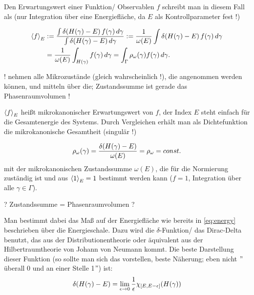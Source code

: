 \documentclass[../KlassMech_main.tex]{subfiles}
\begin{document}
Den Erwartungswert einer Funktion/ Observablen $f$ schreibt man in diesem Fall als (nur Integration über eine Energiefläche, da $E$ als Kontrollparameter fest !)

\begin{align}\label{eq:microzust}
\expval{f}_E &:= %
\frac{\int \delta\qty(H(\gamma) - E) \, f(\gamma) \, d\gamma}{\int \delta\qty(H(\gamma) - E) \, d\gamma} := \frac{1}{\omega(E)} \int \delta\qty(H(\gamma) - E) \, f(\gamma) \, d\gamma
\\
&= \frac{1}{\omega(E)} \int_{H(\gamma)} f(\gamma) \, d\gamma = \int_\Gamma \rho_\omega(\gamma) f(\gamma) \, d\gamma \notag .
\end{align}

! nehmen alle Mikrozustände (gleich wahrscheinlich !), die angenommen werden können, und mitteln über die; Zustandssumme ist gerade das Phasenraumvolumen !

$\expval{f}_E$ heißt mikrokanonischer Erwartungswert von $f$, der Index $E$ steht einfach für die Gesamtenergie des Systems. Durch Vergleichen erhält man als Dichtefunktion die mikrokanonische Gesamtheit (singulär !)

\begin{equation}\label{eq:dichtef}
\rho_\omega(\gamma) = \frac{\delta\qty(H\qty(\gamma) - E)}{\omega(E)} = \rho_\omega = const.
\end{equation}
mit der mikrokanonischen Zustandssumme $\omega(E)$, die für die Normierung zuständig ist und aus $\expval{1}_E = 1$ bestimmt werden kann ($f = 1$, Integration über alle $\gamma \in \Gamma$).


? Zustandssumme = Phasenraumvolumen ?


Man bestimmt dabei das Maß auf der Energiefläche wie bereits in \eqref{eq:energy} beschrieben über die Energieschale. Dazu wird die $\delta$-Funktion/ das Dirac-Delta benutzt, das aus der Distributionentheorie oder äquivalent aus der Hilbertraumtheorie von Johann von Neumann kommt. Die beste Darstellung dieser Funktion (so sollte man sich das vorstellen, beste Näherung; eben nicht $"$überall 0 und an einer Stelle 1$"$) ist:
\begin{equation}
\delta\qty(H(\gamma) - E) = \lim_{\epsilon \rightarrow 0} \frac{1}{\epsilon} \chi_{[E, E-\epsilon]}\qty(H(\gamma))
\end{equation}
\end{document}
